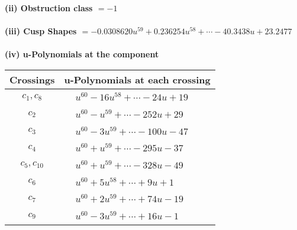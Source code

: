 \documentclass[1p]{elsarticle_modified}
\theoremstyle{definition}
\begin{document}
\flushleft \textbf{(ii) Obstruction class $= -1$}\\~\\
\flushleft \textbf{(iii) Cusp Shapes $= -0.0308620 u^{59}+0.236254 u^{58}+\cdots-40.3438 u+23.2477$}\\~\\
\newpage\renewcommand{\arraystretch}{1}
\flushleft \textbf{(iv) u-Polynomials at the component}\newline \\
\begin{tabular}{m{50pt}|m{274pt}}
Crossings & \hspace{64pt}u-Polynomials at each crossing \\
\hline $$\begin{aligned}c_{1},c_{8}\end{aligned}$$&$\begin{aligned}
&u^{60}-16 u^{58}+\cdots-24 u+19
\end{aligned}$\\
\hline $$\begin{aligned}c_{2}\end{aligned}$$&$\begin{aligned}
&u^{60}- u^{59}+\cdots-252 u+29
\end{aligned}$\\
\hline $$\begin{aligned}c_{3}\end{aligned}$$&$\begin{aligned}
&u^{60}-3 u^{59}+\cdots-100 u-47
\end{aligned}$\\
\hline $$\begin{aligned}c_{4}\end{aligned}$$&$\begin{aligned}
&u^{60}+u^{59}+\cdots-295 u-37
\end{aligned}$\\
\hline $$\begin{aligned}c_{5},c_{10}\end{aligned}$$&$\begin{aligned}
&u^{60}+u^{59}+\cdots-328 u-49
\end{aligned}$\\
\hline $$\begin{aligned}c_{6}\end{aligned}$$&$\begin{aligned}
&u^{60}+5 u^{58}+\cdots+9 u+1
\end{aligned}$\\
\hline $$\begin{aligned}c_{7}\end{aligned}$$&$\begin{aligned}
&u^{60}+2 u^{59}+\cdots+74 u-19
\end{aligned}$\\
\hline $$\begin{aligned}c_{9}\end{aligned}$$&$\begin{aligned}
&u^{60}-3 u^{59}+\cdots+16 u-1
\end{aligned}$\\
\hline
\end{tabular}\\~\\
\end{document}
